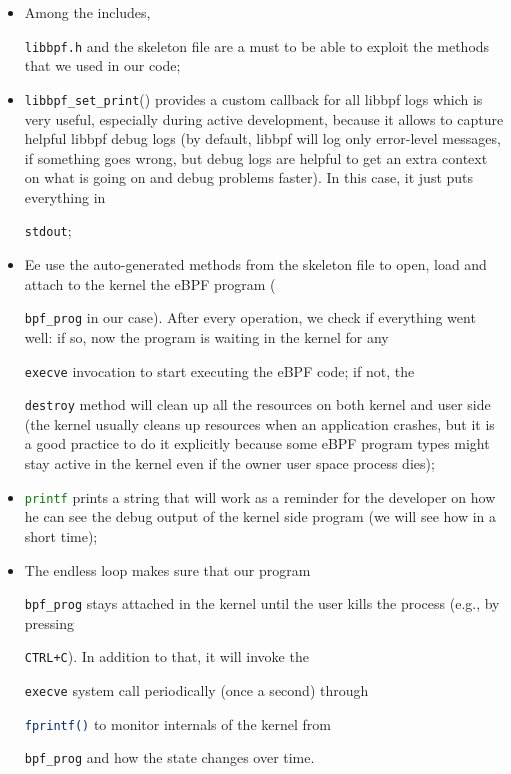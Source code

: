 \begin{itemize}
	\item 
		Among the includes, \raggedright\colorbox{backcolour}{\lstinline[style=commandline, language=bash]|libbpf.h|} and the skeleton file are a must to be able to exploit the methods that we used in our code;
	\item 
		\raggedright\colorbox{backcolour}{\lstinline[style=commandline, language=bash]|libbpf_set_print|()} provides a custom callback for all libbpf logs which is very useful, especially during active development, because it allows to capture helpful libbpf debug logs (by default, libbpf will log only error-level messages, if something goes wrong, but debug logs are helpful to get an extra context on what is going on and debug problems faster).
		In this case, it just puts everything in \raggedright\colorbox{backcolour}{\lstinline[style=commandline, language=bash]|stdout|};
	\item 
		Ee use the auto-generated methods from the skeleton file to open, load and attach to the kernel the eBPF program (\raggedright\colorbox{backcolour}{\lstinline[style=commandline, language=bash]|bpf_prog|} in our case). 
		After every operation, we check if everything went well: if so, now the program is waiting in the kernel for any \raggedright\colorbox{backcolour}{\lstinline[style=commandline, language=bash]|execve|} invocation to start executing the eBPF code; if not, the \raggedright\colorbox{backcolour}{\lstinline[style=commandline, language=bash]|destroy|} method will clean up all the resources on both kernel and user side (the kernel usually cleans up resources when an application crashes, but it is a good practice to do it explicitly because some eBPF program types might stay active in the kernel even if the owner user space process dies);
	\item 
		\raggedright\colorbox{backcolour}{\lstinline[style=commandline, language=bash]|printf|} prints a string that will work as a reminder for the developer on how he can see the debug output of the kernel side program (we will see how in a short time);
	\item 
		The endless loop makes sure that our program \raggedright\colorbox{backcolour}{\lstinline[style=commandline, language=bash]|bpf_prog|} stays attached in the kernel until the user kills the process (e.g., by pressing \raggedright\colorbox{backcolour}{\lstinline[style=commandline, language=bash]|CTRL+C|}). 
		In addition to that, it will invoke the \raggedright\colorbox{backcolour}{\lstinline[style=commandline, language=bash]|execve|} system call periodically (once a second) through \raggedright\colorbox{backcolour}{\lstinline[style=commandline, language=bash]|fprintf()|} to monitor internals of the kernel from \raggedright\colorbox{backcolour}{\lstinline[style=commandline, language=bash]|bpf_prog|} and how the state changes over time.
\end{itemize}


